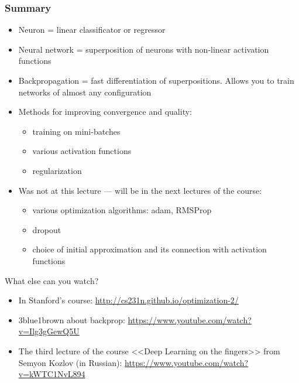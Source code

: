 \documentclass[fullscreen=true, bookmarks=true, hyperref={pdfencoding=unicode}]{beamer}
\begin{document}
\begin{frame}
  \frametitle{Summary}
  \begin{itemize}
      \pause
      \item Neuron = linear classificator or regressor
      \pause
      \item Neural network = superposition of neurons with non-linear activation functions
      \pause
      \item Backpropagation = fast differentiation of superpositions. Allows you to train networks of almost any configuration
      \pause
      \item Methods for improving convergence and quality:
      \begin{itemize}
          \item training on mini-batches
          \item various activation functions
          \item regularization
      \end{itemize}
      \pause
      \item Was not at this lecture — will be in the next lectures of the course:
      \begin{itemize}
          \item various optimization algorithms: adam, RMSProp
          \item dropout
          \item choice of initial approximation and its connection with activation functions
      \end{itemize}
  \end{itemize}
\end{frame}


\begin{frame}{What else can you watch?}
  \begin{itemize}
      \pause
      \item In Stanford's course: \href{http://cs231n.github.io/optimization-2/}{http://cs231n.github.io/optimization-2/}
      \pause
      \item 3blue1brown about backprop: \href{https://www.youtube.com/watch?v=Ilg3gGewQ5U}{https://www.youtube.com/watch?v=Ilg3gGewQ5U}
      \pause
      \item The third lecture of the course <<Deep Learning on the fingers>> from Semyon Kozlov (in Russian): \href{https://www.youtube.com/watch?v=kWTC1NvL894}{https://www.youtube.com/watch?v=kWTC1NvL894}
  \end{itemize}
\end{frame}
\end{document}
